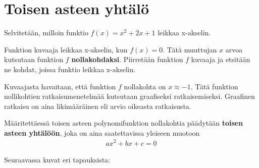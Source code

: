\section{Toisen asteen yhtälö}


\begin{esimerkki}
Selvitetään, milloin funktio $f(x)=x^2+2x+1$ leikkaa x-akselin.

Funktion kuvaaja leikkaa x-akselin, kun $f(x)=0$. Tätä muuttujan $x$ arvoa kutsutaan funktion $f$ \textbf{nollakohdaksi}. Piirretään funktion $f$ kuvaaja ja etsitään ne kohdat, joissa funktio leikkaa x-akselin. %

\begin{kuvaajapohja}{1.5}{-2.5}{0.5}{-0.5}{3}
\end{kuvaajapohja}
\end{esimerkki}

Kuvaajasta havaitaan, että funktion $f$ nollakohta on $x \approx -1$. Tätä funktion nollikohtien ratkaisumenetelmää kutsutaan graafiseksi ratkaisemiseksi.
Graafinen ratkaisu on aina likimääräinen eli arvio oikeasta ratkaisusta.

Määritettäessä toisen asteen polynomifunktion nollakohtia päädytään \textbf{toisen asteen yhtälöön}, joka on aina saatettavissa yleiseen muotoon
\begin{align*}
ax^2+bx+c=0
\end{align*}

Seuraavassa kuvat eri tapauksista:

